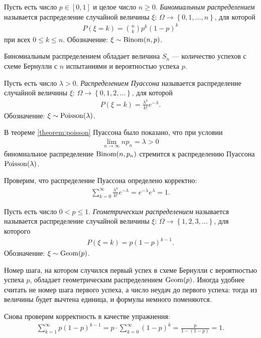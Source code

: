 \documentclass[../main.tex]{subfiles}
\begin{document}
\begin{exmpl} Пусть есть число $ p \in [0,1] $ и целое число $ n \geqslant 0 $. \textit{Биномиальным распределением} называется распределение случайной величины $ \xi \colon\, \Omega \to \left\{ 0, 1, \ldots, n \right\} $, для которой
 \begin{align*}
  P(\xi = k) = \binom n k p^{k}(1-p)^{k}
 \end{align*} при всех $ 0 \leqslant k \leqslant n $. Обозначение: $ \xi \sim \mathrm{Binom}(n,p) $.

 Биномиальным распределением обладает величина $ S_n $ --- количество успехов с схеме Бернулли с $ n $ испытаниями и вероятностью успеха $ p $.
\end{exmpl}
\begin{exmpl}
 Пусть есть число $ \lambda > 0 $. \textit{Распределением Пуассона} называется распределение случайной величины $ \xi\colon\,\Omega\to \left\{ 0,1,2,\ldots \right\} $, для которой
 \begin{align*}
  P(\xi = k) = \frac{\lambda^{k}}{k!} e^{-\lambda}.
 \end{align*} Обозначение: $ \xi \sim  \mathrm{Poisson}(\lambda)$.

 В теореме \ref{theorem:poisson} Пуассона было показано, что при условии
 \begin{align*}
  \lim_{n \to \infty} np_n = \lambda > 0 
 \end{align*} биномиальное распределение $ \mathrm{Binom}(n,p_n) $ стремится к распределению Пуассона $ \mathrm{Poisson}(\lambda) $.

 Проверим, что распределение Пуассона определено корректно:
 \begin{align*}
  \sum_{k=0}^{\infty} \frac{\lambda^{k}}{k!}e^{-\lambda} = e^{-\lambda} e^{\lambda} = 1.
 \end{align*} 
\end{exmpl}
\begin{exmpl}
 Пусть есть число $ 0 < p \leqslant 1 $. \textit{Геометрическим распределением} называется называется распределение случайной величины $ \xi \colon\,\Omega \to \left\{ 1,2,3,\ldots \right\} $, для которого
 \begin{align*}
  P(\xi = k) = p(1-p)^{k-1}.
 \end{align*} Обозначение: $ \xi \sim \mathrm{Geom}(p) $.

 Номер шага, на котором случился первый успех в схеме Бернулли с вероятностью успеха $ p $, обладает геометрическим распределением $ \mathrm{Geom}(p) $. Иногда удобнее считать не номер шага первого успеха, а число неудач до первого успеха: тогда из величины будет вычтена единица, и формулы немного поменяются.

 Снова проверим корректность в качестве упражнения:
 \begin{align*}
  \sum_{k=1}^{\infty} p(1-p)^{k-1} = p \cdot \sum_{k=0}^{\infty} (1-p)^{k} = \frac{p}{1 - (1-p)} = 1.
 \end{align*} 
\end{exmpl}
\end{document}
